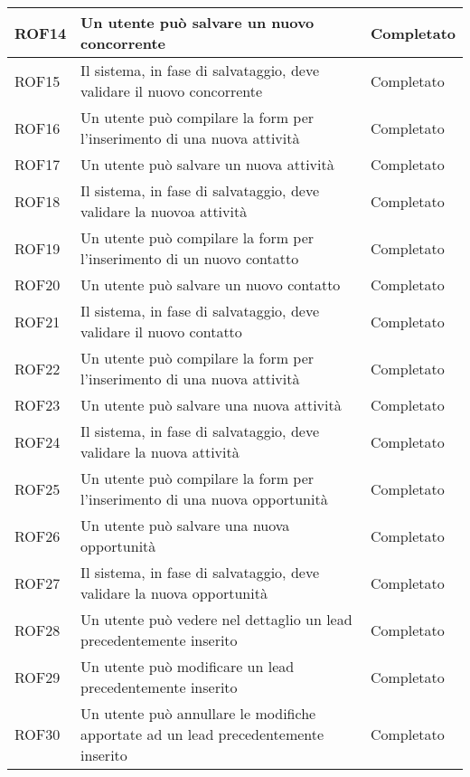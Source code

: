 \begin{longtable}[h]{|p{2.5cm}|p{8cm}|p{2.5cm}|}
	ROF14&Un utente può salvare un nuovo concorrente&Completato\\
	\hline
	\rule[-3mm]{0mm}{0.8cm}
	ROF15&Il sistema, in fase di salvataggio, deve validare il nuovo concorrente&Completato \\
	\hline
	\rule[-3mm]{0mm}{0.8cm}
	ROF16&Un utente può compilare la form per l'inserimento di una nuova attività  & Completato\\
	\hline
	\rule[-3mm]{0mm}{0.8cm}
	ROF17&Un utente può salvare un nuova attività&Completato\\
	\hline
	\rule[-3mm]{0mm}{0.8cm}
	ROF18&Il sistema, in fase di salvataggio, deve validare la nuovoa attività&Completato \\
	\hline
	\rule[-3mm]{0mm}{0.8cm}
	ROF19&Un utente può compilare la form per l'inserimento di un nuovo contatto&Completato\\
	\hline
	\rule[-3mm]{0mm}{0.8cm}
	ROF20&Un utente può salvare un nuovo contatto&Completato\\
	\hline
	\rule[-3mm]{0mm}{0.8cm}
	ROF21&Il sistema, in fase di salvataggio, deve validare il nuovo contatto&Completato \\
	\hline
	\rule[-3mm]{0mm}{0.8cm}
	ROF22&Un utente può compilare la form per l'inserimento di una nuova attività  &Completato\\
	\hline
	\rule[-3mm]{0mm}{0.8cm}
	ROF23&Un utente può salvare una nuova attività&Completato\\
	\hline
	\rule[-3mm]{0mm}{0.8cm}
	ROF24&Il sistema, in fase di salvataggio, deve validare la nuova attività&Completato \\
	\hline
	\rule[-3mm]{0mm}{0.8cm}
	ROF25&Un utente può compilare la form per l'inserimento di una nuova opportunità  &Completato\\
	\hline
	\rule[-3mm]{0mm}{0.8cm}
	ROF26&Un utente può salvare una nuova opportunità&Completato\\
	\hline
	\rule[-3mm]{0mm}{0.8cm}
	ROF27&Il sistema, in fase di salvataggio, deve validare la nuova opportunità&Completato \\
	\hline
	\rule[-3mm]{0mm}{0.8cm}
	ROF28&Un utente può vedere nel dettaglio un lead precedentemente inserito&Completato\\
	\hline
	\rule[-3mm]{0mm}{0.8cm}
	ROF29&Un utente può modificare un lead precedentemente inserito&Completato\\
	\hline
	\rule[-3mm]{0mm}{0.8cm}
	ROF30&Un utente può annullare le modifiche apportate ad un lead precedentemente inserito&Completato\\

\end{longtable}
